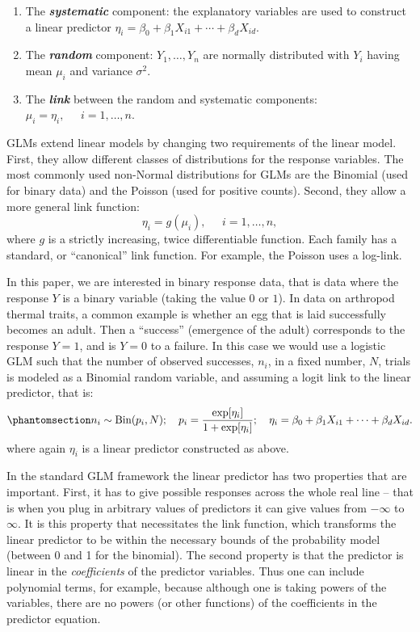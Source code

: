 \documentclass[
  12pt,
]{article}
\providecommand{\tightlist}{%
  \setlength{\itemsep}{0pt}\setlength{\parskip}{0pt}}
\begin{document}
\begin{enumerate}
\def\labelenumi{\arabic{enumi}.}
\tightlist
\item
  The \textbf{\emph{systematic}} component: the explanatory variables
  are used to construct a linear predictor
  \(\eta_i = \beta_0 + \beta_1 X_{i1} + \cdots + \beta_d X_{id}.\)
\item
  The \textbf{\emph{random}} component: \(Y_1,\dots,Y_n\) are normally
  distributed with \(Y_i\) having mean \(\mu_i\) and variance
  \(\sigma^2\).
\item
  The \textbf{\emph{link}} between the random and systematic components:
  \(\mu_i = \eta_i, \;\;\;\;\; i=1,\dots,n\).
\end{enumerate}

GLMs extend linear models by changing two requirements of the linear
model. First, they allow different classes of distributions for the
response variables. The most commonly used non-Normal distributions for
GLMs are the Binomial (used for binary data) and the Poisson (used for
positive counts). Second, they allow a more general link function: \[
\eta_i = g(\mu_i), \;\;\;\;\; i=1,\dots,n,
\] where \(g\) is a strictly increasing, twice differentiable function.
Each family has a standard, or ``canonical'' link function. For example,
the Poisson uses a log-link.

In this paper, we are interested in binary response data, that is data
where the response \(Y\) is a binary variable (taking the value \(0\) or
\(1\)). In data on arthropod thermal traits, a common example is whether
an egg that is laid successfully becomes an adult. Then a ``success''
(emergence of the adult) corresponds to the response \(Y=1\), and is
\(Y=0\) to a failure. In this case we would use a logistic GLM such that
the number of observed successes, \(n_i\), in a fixed number, \(N\),
trials is modeled as a Binomial random variable, and assuming a logit
link to the linear predictor, that is:
\begin{equation}\phantomsection\label{eq-logistic}{
n_i \sim \mathrm{Bin}(p_i, N); ~~~ p_i = \frac{\exp[\eta_i]}{1+\exp[\eta_i]}; ~~~ \eta_i = \beta_0 + \beta_1 X_{i1} + \cdots + \beta_d X_{id}. 
}\end{equation} where again \(\eta_i\) is a linear predictor constructed
as above.

In the standard GLM framework the linear predictor has two properties
that are important. First, it has to give possible responses across the
whole real line -- that is when you plug in arbitrary values of
predictors it can give values from \(-\infty\) to \(\infty\). It is this
property that necessitates the link function, which transforms the
linear predictor to be within the necessary bounds of the probability
model (between 0 and 1 for the binomial). The second property is that
the predictor is linear in the \emph{coefficients} of the predictor
variables. Thus one can include polynomial terms, for example, because
although one is taking powers of the variables, there are no powers (or
other functions) of the coefficients in the predictor equation.
\end{document}
